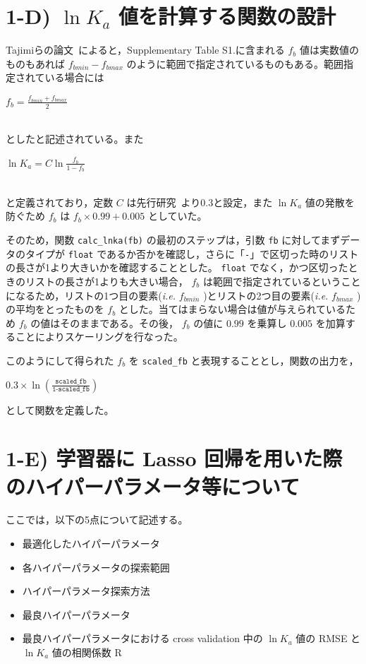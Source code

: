 \documentclass[a4j,11pt]{jarticle}
\begin{document}
\section{1-D)  $\ln{K_a}$ 値を計算する関数の設計}
Tajimiらの論文~\cite{paper1_Tajimi}によると，Supplementary Table S1.に含まれる $f_b$ 値は実数値のものもあれば $f_{bmin}-f_{bmax}$ のように範囲で指定されているものもある。範囲指定されている場合には\\
\linebreak
\centerline{$f_b = \frac{f_{bmin} + f_{bmax}}{2}$}\\
\linebreak
としたと記述されている。また\\
\linebreak
\centerline{$\ln{K_a}=C\ln{\frac{f_b}{1-f_b}}$}\\
\linebreak
と定義されており，定数 $C$ は先行研究~\cite{C_previous}より$0.3$と設定，また $\ln{K_a}$ 値の発散を防ぐため $f_b$ は $f_b\times0.99+0.005$ としていた。\par
そのため，関数 \texttt{calc\_lnka(fb)} の最初のステップは，引数 \texttt{fb} に対してまずデータのタイプが \texttt{float} であるか否かを確認し，さらに「\texttt{-}」で区切った時のリストの長さが1より大きいかを確認することとした。 \texttt{float} でなく，かつ区切ったときのリストの長さが1よりも大きい場合， $f_b$ は範囲で指定されているということになるため，リストの1つ目の要素(\textit{i.e.}  $f_{bmin}$ )とリストの2つ目の要素(\textit{i.e.}  $f_{bmax}$ )の平均をとったものを $f_b$ とした。当てはまらない場合は値が与えられているため $f_b$ の値はそのままである。その後， $f_b$ の値に $0.99$ を乗算し $0.005$ を加算することによりスケーリングを行なった。\par
このようにして得られた $f_b$ を \texttt{scaled\_fb} と表現することとし，関数の出力を，\\
\linebreak
\linebreak
\centerline{$0.3\times\ln(\frac{\texttt{scaled\_fb}}{\texttt{1-scaled\_fb}})$}
\linebreak
\linebreak
として関数を定義した。

\section{1-E) 学習器に Lasso 回帰を用いた際のハイパーパラメータ等について}
ここでは，以下の5点について記述する。\\
\begin{itemize}
\item 最適化したハイパーパラメータ
\item 各ハイパーパラメータの探索範囲
\item ハイパーパラメータ探索方法
\item 最良ハイパーパラメータ
\item 最良ハイパーパラメータにおける cross validation 中の $\ln{K_a}$ 値の RMSE と $\ln{K_a}$ 値の相関係数 R 
\end{itemize}
\end{document}
